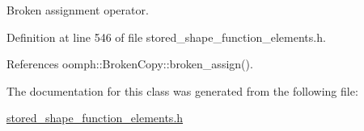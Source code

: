 Broken assignment operator. 



Definition at line 546 of file stored\+\_\+shape\+\_\+function\+\_\+elements.\+h.



References oomph\+::\+Broken\+Copy\+::broken\+\_\+assign().



The documentation for this class was generated from the following file\+:\begin{DoxyCompactItemize}
\item 
\hyperlink{stored__shape__function__elements_8h}{stored\+\_\+shape\+\_\+function\+\_\+elements.\+h}\end{DoxyCompactItemize}
